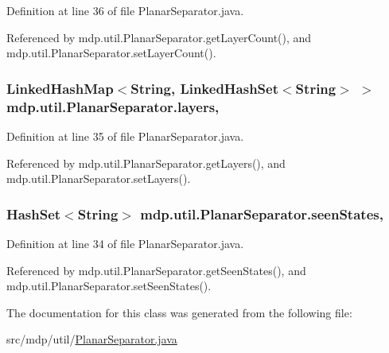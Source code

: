 Definition at line 36 of file Planar\+Separator.\+java.



Referenced by mdp.\+util.\+Planar\+Separator.\+get\+Layer\+Count(), and mdp.\+util.\+Planar\+Separator.\+set\+Layer\+Count().

\hypertarget{classmdp_1_1util_1_1_planar_separator_acb79e999c0d8e484b52978cd3225420e}{}
\subsubsection[{layers}]{\setlength{\rightskip}{0pt plus 5cm}Linked\+Hash\+Map$<$String, Linked\+Hash\+Set$<$String$>$ $>$ mdp.\+util.\+Planar\+Separator.\+layers\hspace{0.3cm}{\ttfamily [static]}, {\ttfamily [private]}}\label{classmdp_1_1util_1_1_planar_separator_acb79e999c0d8e484b52978cd3225420e}


Definition at line 35 of file Planar\+Separator.\+java.



Referenced by mdp.\+util.\+Planar\+Separator.\+get\+Layers(), and mdp.\+util.\+Planar\+Separator.\+set\+Layers().

\hypertarget{classmdp_1_1util_1_1_planar_separator_a9abf62832f8732e6f6304db702296da9}{}
\subsubsection[{seen\+States}]{\setlength{\rightskip}{0pt plus 5cm}Hash\+Set$<$String$>$ mdp.\+util.\+Planar\+Separator.\+seen\+States\hspace{0.3cm}{\ttfamily [static]}, {\ttfamily [private]}}\label{classmdp_1_1util_1_1_planar_separator_a9abf62832f8732e6f6304db702296da9}


Definition at line 34 of file Planar\+Separator.\+java.



Referenced by mdp.\+util.\+Planar\+Separator.\+get\+Seen\+States(), and mdp.\+util.\+Planar\+Separator.\+set\+Seen\+States().



The documentation for this class was generated from the following file\+:\begin{DoxyCompactItemize}
\item 
src/mdp/util/\hyperlink{_planar_separator_8java}{Planar\+Separator.\+java}\end{DoxyCompactItemize}
